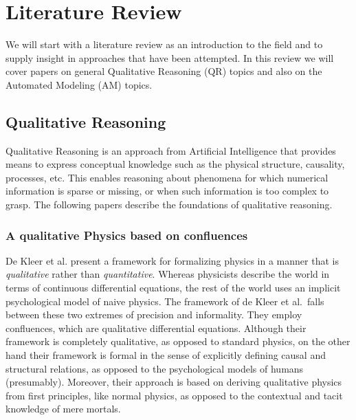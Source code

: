 \documentclass{article} %
\begin{document}
\section{Literature Review}
\label{sec:litrev}
We will start with a literature review as an introduction to the field and to
supply insight in approaches that have been attempted. In this review we will
cover papers on general Qualitative Reasoning (QR) topics and also on the
Automated Modeling (AM) topics.


\subsection{Qualitative Reasoning}
\label{sec:litrev_qr}
Qualitative Reasoning is an approach from Artificial Intelligence that provides
means to express conceptual knowledge such as the physical structure,
causality, processes, etc.  This enables reasoning about phenomena for which
numerical information is sparse or missing, or when such information is too
complex to grasp.  The following papers describe the foundations of qualitative
reasoning.

\subsubsection{A qualitative Physics based on confluences}
\label{sec:litrev_qr_dekleer}
De Kleer et al. \cite{kleer} present a framework for formalizing physics in a
manner that is {\em qualitative} rather than {\em quantitative}. Whereas
physicists describe the world in terms of continuous differential equations,
the rest of the world uses an implicit psychological model of naive physics.
The framework of de Kleer et al.\ falls between these two extremes of precision
and informality. They employ confluences, which are qualitative differential
equations.  Although their framework is completely qualitative, as opposed to
standard physics, on the other hand their framework is formal in the sense of
explicitly defining causal and structural relations, as opposed to the
psychological models of humans (presumably). Moreover, their approach is based
on deriving qualitative physics from first principles, like normal physics, as
opposed to the contextual and tacit knowledge of mere mortals.
\end{document}
